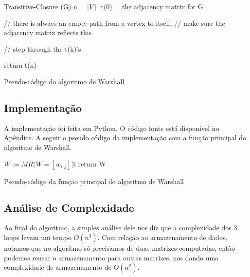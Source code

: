 \documentclass[a4paper,12pt]{article}
\begin{document}
\begin{algorithm}[H]
Transitive-Closure (G)\;
        n = $\mid V\mid$\;
        t(0) = the adjacency matrix for G\;

        // there is always an empty path from a vertex to itself,
        // make sure the adjacency matrix reflects this


        // step through the t(k)'s\;

        return t(n)\;
	\caption{Pseudo-código do algoritmo de Warshall}
\end{algorithm}

\subsection{Implementação}

A implementação foi feita em Python. O código fonte está disponível no Apêndice. A seguir o pseudo código da implementação com a função principal do algoritmo de Warshall.

\begin{algorithm}[H]
$W := MR( W = [w_{i,j}] $)i
return W\;
\caption {Pseudo-código da função principal do algoritmo de Warshall}
\end{algorithm}


\subsection{Análise de Complexidade}

Ao final do algoritmo, a simples análise dele nos diz que a complexidade dos 3 loops levam um tempo $O(n^3)$. Com relação ao armazenamento de dados, notamos que no algoritmo só precisamos de duas matrizes computadas, então podemos reusar o armazenamento para outras matrizes, nos dando uma complexidade de armazenamento de $O(n^2)$.
\end{document}
